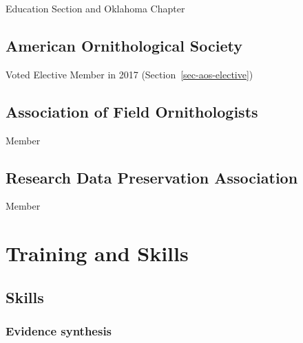 \documentclass[
  letterpaper,
  DIV=11,
  numbers=noendperiod,
  oneside]{scrreprt}
\begin{document}
Education Section and Oklahoma Chapter

\section{American Ornithological
Society}\label{american-ornithological-society}


Voted Elective Member in 2017 (Section~\ref{sec-aos-elective})

\section{Association of Field
Ornithologists}\label{association-of-field-ornithologists}


Member

\section{Research Data Preservation
Association}\label{research-data-preservation-association}


Member


\chapter{Training and Skills}\label{training-and-skills}

\section{Skills}\label{skills}

\subsection{Evidence synthesis}\label{evidence-synthesis}
\end{document}
